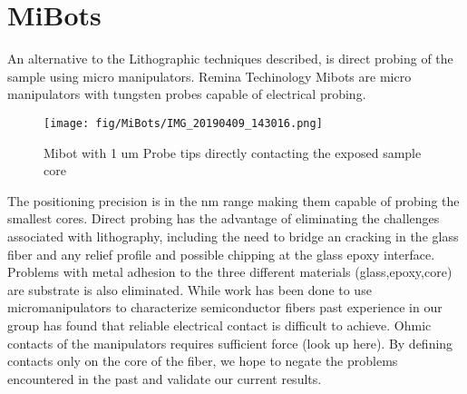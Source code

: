 
\chapter{MiBots}
An alternative to the Lithographic techniques described, is direct probing of the sample using micro manipulators. Remina Techinology Mibots are micro manipulators with tungsten probes capable of electrical probing. 

\begin{wrapfigure}{r}{.25\textwidth}
\texttt{[image: fig/MiBots/IMG\_20190409\_143016.png]}
\caption{Mibot with 1 um Probe tips directly contacting the exposed sample core}
\end{wrapfigure}

The positioning precision is in the nm range making them capable of probing the smallest cores. Direct probing has the advantage of eliminating the challenges associated with lithography, including the need to bridge an cracking in the glass fiber and any relief profile and possible chipping at the glass epoxy interface. Problems with metal adhesion to the three different materials (glass,epoxy,core) are substrate is also eliminated. While work has been done to use micromanipulators to characterize semiconductor fibers %
past experience in our group has found that reliable electrical contact is difficult to achieve. Ohmic contacts of the manipulators requires sufficient force (look up here). By defining contacts only on the core of the fiber, we hope to negate the problems encountered in the past and validate our current results. 
\cleardoublepage